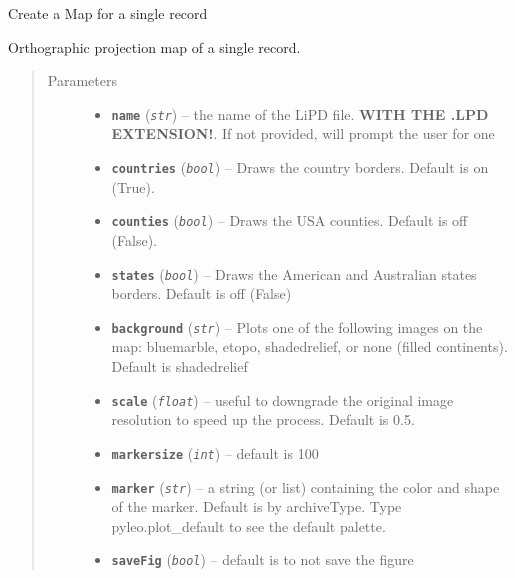 \documentclass[letterpaper,10pt,english]{sphinxmanual}
\begin{document}
\begin{fulllineitems}
\label{Main:pyleoclim.MapLiPD}
Create a Map for a single record

Orthographic projection map of a single record.
\begin{quote}\begin{description}
\item[{Parameters}] \leavevmode\begin{itemize}
\item {} 
\textbf{\texttt{name}} (\emph{\texttt{str}}) -- the name of the LiPD file. \textbf{WITH THE .LPD EXTENSION!}.
If not provided, will prompt the user for one

\item {} 
\textbf{\texttt{countries}} (\emph{\texttt{bool}}) -- Draws the country borders. Default is on (True).

\item {} 
\textbf{\texttt{counties}} (\emph{\texttt{bool}}) -- Draws the USA counties. Default is off (False).

\item {} 
\textbf{\texttt{states}} (\emph{\texttt{bool}}) -- Draws the American and Australian states borders.
Default is off (False)

\item {} 
\textbf{\texttt{background}} (\emph{\texttt{str}}) -- Plots one of the following images on the map:
bluemarble, etopo, shadedrelief, or none (filled continents).
Default is shadedrelief

\item {} 
\textbf{\texttt{scale}} (\emph{\texttt{float}}) -- useful to downgrade the original image resolution to
speed up the process. Default is 0.5.

\item {} 
\textbf{\texttt{markersize}} (\emph{\texttt{int}}) -- default is 100

\item {} 
\textbf{\texttt{marker}} (\emph{\texttt{str}}) -- a string (or list) containing the color and shape of the
marker. Default is by archiveType. Type pyleo.plot\_default to see
the default palette.

\item {} 
\textbf{\texttt{saveFig}} (\emph{\texttt{bool}}) -- default is to not save the figure


\end{itemize}
\end{description}
\end{quote}
\end{fulllineitems}
\end{document}
